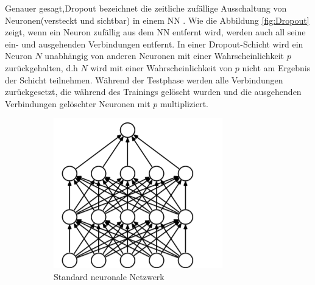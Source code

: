 \documentclass[12pt,a4paper]{scrartcl}
\numberwithin{equation}{section}
\begin{document}
Genauer gesagt,Dropout bezeichnet die zeitliche zufällige Ausschaltung von Neuronen(versteckt und sichtbar)  in einem  \ac{NN} \cite{3}. Wie die Abbildung \ref{fig:Dropout} zeigt, wenn ein Neuron zufällig aus dem \ac{NN} entfernt wird, werden auch all seine ein- und ausgehenden Verbindungen entfernt.
In einer Dropout-Schicht wird ein Neuron $ \textit{N} $ unabhängig von anderen Neuronen mit einer Wahrscheinlichkeit $ {p} $ zurückgehalten, d.h $ \textit{N} $ wird mit einer Wahrscheinlichkeit von $ {p} $ nicht am Ergebnis der Schicht teilnehmen. Während der Testphase  werden alle Verbindungen zurückgesetzt, die während des Trainings gelöscht wurden und die ausgehenden Verbindungen gelöschter Neuronen mit $ p $   multipliziert.
	
\begin{figure}[h!]
	\begin{subfigure}{.5\textwidth}
		\centering
		\includegraphics[scale=2, width=.8\linewidth, height=\linewidth]{dropout1.png}
		\caption{Standard neuronale Netzwerk}
		\label{fig:dropout1}
	\end{subfigure}%
	\begin{subfigure}{.5\textwidth}
		\centering

\end{subfigure}
\end{figure}
\end{document}
